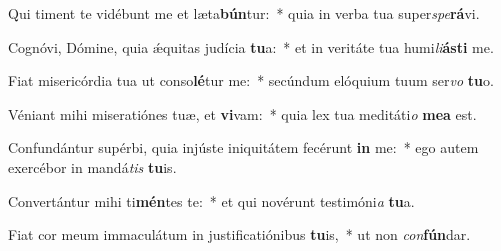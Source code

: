 \item Qui timent te vidébunt me et læta\textbf{bún}tur:~* quia in verba tua super\textit{spe}\textbf{rá}vi.
\item Cognóvi, Dómine, quia ǽquitas judícia \textbf{tu}a:~* et in veritáte tua humi\textit{li}\textbf{ás}\textbf{ti} me.
\item Fiat misericórdia tua ut conso\textbf{lé}tur me:~* secúndum elóquium tuum ser\textit{vo} \textbf{tu}o.
\item Véniant mihi miseratiónes tuæ, et \textbf{vi}vam:~* quia lex tua meditáti\textit{o} \textbf{me}\textbf{a} est.
\item Confundántur supérbi, quia injúste iniquitátem fecérunt \textbf{in} me:~* ego autem exercébor in mandá\textit{tis} \textbf{tu}is.
\item Convertántur mihi ti\textbf{mén}tes te:~* et qui novérunt testimóni\textit{a} \textbf{tu}a.
\item Fiat cor meum immaculátum in justificatiónibus \textbf{tu}is,~* ut non \textit{con}\textbf{fún}dar.
